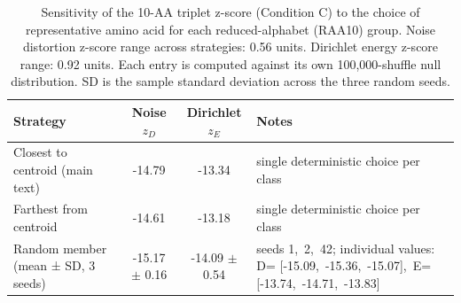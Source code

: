 \begin{table}[htbp]
\centering
\caption{Sensitivity of the 10-AA triplet z-score (Condition C) to the choice of representative amino acid for each reduced-alphabet (RAA10) group. Noise distortion z-score range across strategies: 0.56 units. Dirichlet energy z-score range: 0.92 units. Each entry is computed against its own 100{,}000-shuffle null distribution. SD is the sample standard deviation across the three random seeds.}
\label{tab:S1}
\begin{tabular}{lccp{5cm}}
\toprule
Strategy & Noise $z_D$ & Dirichlet $z_E$ & Notes \\
\midrule
Closest to centroid (main text) & -14.79 & -13.34 & \small single deterministic choice per class \\
Farthest from centroid & -14.61 & -13.18 & \small single deterministic choice per class \\
Random member (mean ± SD, 3 seeds) & -15.17 $\pm$ 0.16 & -14.09 $\pm$ 0.54 & \small seeds 1,\, 2,\, 42; individual values: D= [-15.09,\, -15.36,\, -15.07],\, E= [-13.74,\, -14.71,\, -13.83] \\
\bottomrule
\end{tabular}
\end{table}
